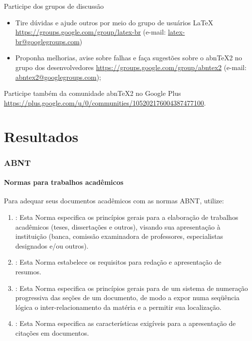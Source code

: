 \documentclass[aspectratio=169]{beamer}
\begin{document}
\begin{frame}{Participe dos grupos de discussão}

\begin{itemize}
  \item Tire dúvidas e ajude outros por meio do grupo de usuários LaTeX
  \url{https://groups.google.com/group/latex-br} (e-mail:
  \url{latex-br@googlegroups.com})

  \item Proponha melhorias, avise sobre falhas e faça sugestões sobre o abnTeX2
  no grupo dos desenvolvedores \url{https://groups.google.com/group/abntex2}
  (e-mail: \url{abntex2@googlegroups.com});
\end{itemize}

Participe também da comunidade abnTeX2 no Google Plus
\url{https://plus.google.com/u/0/communities/105202176004387477100}.

\end{frame}

\section{Resultados}

\begin{frame}
\frametitle{ABNT}
\framesubtitle{Normas para trabalhos acadêmicos}

Para adequar seus documentos acadêmicos com as normas ABNT, utilize:
\begin{enumerate}
 \item {}: Esta Norma especifica os princípios gerais
 para a elaboração de trabalhos acadêmicos (teses, dissertações e outros),
 visando sua apresentação à instituição (banca, comissão examinadora de
 professores, especialistas designados e/ou outros).

 \item {}: Esta Norma estabelece os requisitos para
 redação e apresentação de resumos.

 \item {}: Esta Norma especifica os princípios gerais
 para de um sistema de numeração progressiva das seções de um documento, de
 modo a expor numa seqüência lógica o inter-relacionamento da matéria e a
 permitir sua localização.

 \item {}: Esta Norma especifica as características
 exigíveis para a apresentação de citações em documentos.
\end{enumerate}

\end{frame}
\end{document}
